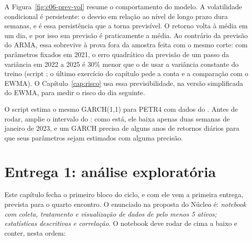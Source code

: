 A Figura~\ref{fig:c06-prev-vol} resume o comportamento do modelo. A volatilidade condicional é persistente: o desvio em relação ao nível de longo prazo dura semanas, e é essa persistência que a torna previsível. O retorno volta à média em um dia, e por isso sua previsão é praticamente a média. Ao contrário da previsão do ARMA, essa sobrevive à prova fora da amostra feita com o mesmo corte: com parâmetros fixados em 2021, o erro quadrático da previsão de um passo da variância em 2022 a 2025 é 30\% menor que o de usar a variância constante do treino (script ; o último exercício do capítulo pede a conta e a comparação com o EWMA). O Capítulo~\ref{cap:risco} usa essa previsibilidade, na versão simplificada do EWMA, para medir o risco do dia seguinte.

\begin{repositorio}
O script  estima o mesmo GARCH(1,1) para PETR4 com dados do . Antes de rodar, amplie o intervalo do : como está, ele baixa apenas duas semanas de janeiro de 2023, e um GARCH precisa de alguns anos de retornos diários para que seus parâmetros sejam estimados com alguma precisão.
\end{repositorio}

\section{Entrega 1: análise exploratória}
\label{sec:c06-entrega}

Este capítulo fecha o primeiro bloco do ciclo, e com ele vem a primeira entrega, prevista para o quarto encontro. O enunciado na proposta do Núcleo é: \emph{notebook com coleta, tratamento e visualização de dados de pelo menos 5 ativos; estatísticas descritivas e correlação}. O notebook deve rodar de cima a baixo e conter, nesta ordem:

